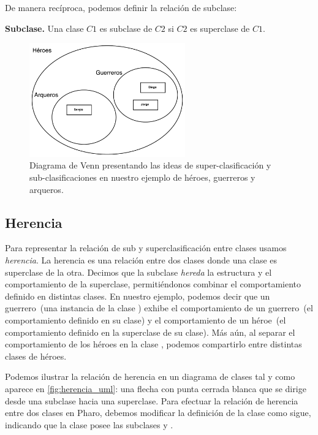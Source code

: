 \documentclass[a4paper,12pt]{book}
\begin{document}
De manera recíproca, podemos definir la relación de subclase:

\begin{definition}\textbf{Subclase.} 
Una clase $C1$ es subclase de $C2$ si $C2$ es superclase de $C1$.
\end{definition}

\begin{figure}
    \centering
    \includegraphics[width=0.6\textwidth]{figures/venn_clasificacion.pdf}
    \caption{Diagrama de Venn presentando las ideas de super-clasificación y sub-clasificaciones en nuestro ejemplo de héroes, guerreros y arqueros.\label{fig:herencia_venn}}
\end{figure}


\subsection{Herencia}

Para representar la relación de sub y superclasificación entre clases usamos \emph{herencia}.
La herencia es una relación entre dos clases donde una clase es superclase de la otra. Decimos que la subclase \emph{hereda} la estructura y el comportamiento de la superclase, permitiéndonos combinar el comportamiento definido en distintas clases. En nuestro ejemplo, podemos decir que un guerrero~(\ie una instancia de la clase ) exhibe el comportamiento de un guerrero~(\ie el comportamiento definido en su clase) y el comportamiento de un héroe~(\ie el comportamiento definido en la superclase de su clase). Más aún, al separar el comportamiento de los héroes en la clase , podemos compartirlo entre distintas clases de héroes.

Podemos ilustrar la relación de herencia en un diagrama de clases tal y como aparece en \autoref{fig:herencia_uml}: una flecha con punta cerrada blanca que se dirige desde una subclase hacia una superclase. Para efectuar la relación de herencia entre dos clases en Pharo, debemos modificar la definición de la clase como sigue, indicando que la clase  posee las subclases  y . 
\end{document}
